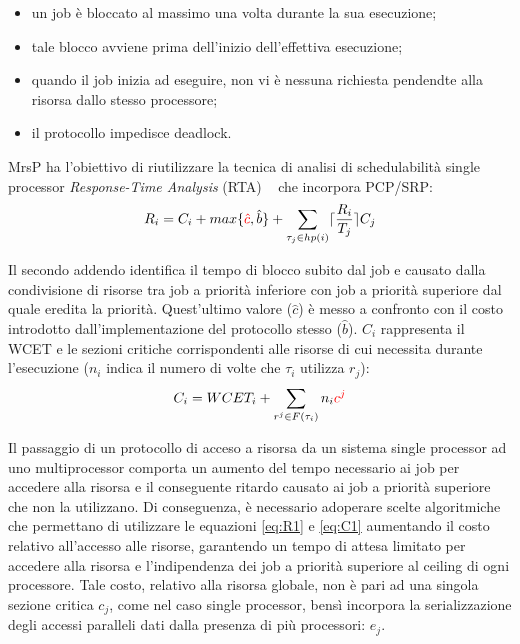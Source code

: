 \begin{itemize}
\item un job è bloccato al massimo una volta durante la sua esecuzione;
\item tale blocco avviene prima dell’inizio dell’effettiva esecuzione;
\item quando il job inizia ad eseguire, non vi è nessuna richiesta pendendte alla risorsa dallo stesso processore;
\item il protocollo impedisce deadlock.
\end{itemize}

MrsP ha l’obiettivo di riutilizzare la tecnica di analisi di schedulabilità single processor \textit{Response-Time Analysis} (RTA) ~\cite{Audsley93applyingnew} che incorpora PCP/SRP:\\

\begin{equation}\label{eq:R1}
R_i = C_i + max \text{\{\textcolor{red}{$\hat{c}$}},\hat{b}\} + \sum\limits_{\tau_j \in hp(i)} \lceil\frac{R_i}{T_j}\rceil C_j
\end{equation}

\vspace{4 mm}

Il secondo addendo identifica il tempo di blocco subito dal job e causato dalla condivisione di risorse tra job a priorità inferiore con job a priorità superiore dal quale eredita la priorità. Quest'ultimo valore ($\hat{c}$) è messo a confronto con il costo introdotto dall'implementazione del protocollo stesso ($\hat{b}$). $C_i$ rappresenta il WCET e le sezioni critiche corrispondenti alle risorse di cui necessita durante l’esecuzione ($n_i$ indica il numero di volte che $\tau_i$ utilizza $r_j$):\\

\begin{equation}\label{eq:C1}
C_i = WCET_i + \sum\limits_{r^j \in F(\tau_i)} n_i \text{\textcolor{red}{$c^j$}}
\end{equation}

\vspace{4 mm}

Il passaggio di un protocollo di acceso a risorsa da un sistema single processor ad uno multiprocessor comporta un aumento del tempo necessario ai job per accedere alla risorsa e il conseguente ritardo causato ai job a priorità superiore che non la utilizzano. Di conseguenza, è necessario adoperare scelte algoritmiche che permettano di utilizzare le equazioni \ref{eq:R1} e \ref{eq:C1} aumentando il costo relativo all’accesso alle risorse, garantendo un tempo di attesa limitato per accedere alla risorsa e l'indipendenza dei job a priorità superiore al ceiling di ogni processore. Tale costo, relativo alla risorsa globale, non è pari ad una singola sezione critica $c_j$, come nel caso single processor, bensì incorpora la serializzazione degli accessi paralleli dati dalla presenza di più processori: $e_j$.\\

